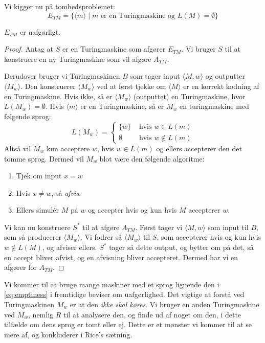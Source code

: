 Vi kigger nu på tomhedsproblemet:
\begin{equation}
	\label{eq:etm}
	E_{TM} = \{\langle m \rangle \mid m \text{ er en Turingmaskine og } L(M) = \emptyset\}
\end{equation}
\begin{theorem}
	$E_{TM}$ er uafgørligt.
\end{theorem}
\begin{proof}
	Antag at $S$ er en Turingmaskine som afgører $E_{TM}$. Vi bruger $S$ til at konstruere en ny Turingmaskine som vil afgøre $A_{TM}$.

	Derudover bruger vi Turingmaskinen $B$ som tager input \(\langle M, w \rangle \) og outputter $\langle M_{w} \rangle$. Den konstruerer $\langle M_{w} \rangle $ ved at først tjekke om \(\langle M \rangle \) er en korrekt kodning af en Turingmaskine. Hvis ikke, så er $\langle M_{w} \rangle $ (outputtet) en Turingmaskine, hvor $L(M_{w}) = \emptyset$. Hvis \(\langle m \rangle \) er en Turingmaskine, så er $M_{w}$ en turingmaskine med følgende sprog:
	\begin{equation}
		\label{eq:emptiness}
		L(M_{w}) = \begin{cases}
			\{w\}     & \text{ hvis } w \in L(m)    \\
			\emptyset & \text{ hvis } w \notin L(m)
		\end{cases}
	\end{equation}
	Altså vil $M_{w}$ kun acceptere $w$, hvis $w \in L(m)$ og ellers accepterer den det tomme sprog. Dermed vil $M_{w}$ blot være den følgende algoritme:
	\begin{enumerate}
		\item Tjek om input $x = w$
		\item Hvis $x \ne w$, så \textit{afvis}.
		\item Ellers simulér $M$ på $w$ og accepter hvis og kun hvis $M$ accepterer $w$.
	\end{enumerate}

	Vi kan nu konstruere $S^{*}$ til at afgøre $A_{TM}$. Først tager vi $\langle M , w\rangle $ som input til $B$, som så producerer $\langle M_{w} \rangle $. Vi fodrer så $\langle M_{w} \rangle $ til $S$, som accepterer hvis og kun hvis $w \notin L(M)$, og afviser ellers. $S^{*}$ tager så dette output, og bytter om på det, så en accept bliver afvist, og en afvisning bliver accepteret. Dermed har vi en afgører for $A_{TM}$.
\end{proof}

Vi kommer til at bruge mange maskiner med et sprog lignende den i \eqref{eq:emptiness} i fremtidige beviser om uafgørlighed. Det vigtige at forstå ved Turingmaskinen $M_{w}$ er at den \textit{ikke skal køres}. Vi bruger en anden Turingmaskine ved $M_{w}$, nemlig $R$ til at analysere den, og finde ud af noget om den, i dette tilfælde om dens sprog er tomt eller ej. Dette er et mønster vi kommer til at se mere af, og konkluderer i Rice's sætning.

